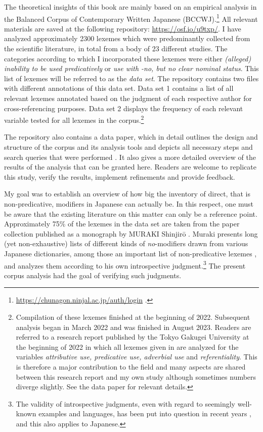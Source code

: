 \documentclass [output=book,colorlinks,citecolor=brown]{langscibook}
\begin{document}
The theoretical insights of this book are mainly based on an empirical analysis in the Balanced Corpus of Contemporary Written Japanese (BCCWJ).\footnote{\url{https://chunagon.ninjal.ac.jp/auth/login} \citep{maekawa:2014:bccwj}.} All relevant materials are saved at the following repository: \url{https://osf.io/u9txp/}. I have analyzed approximately 2300 lexemes which were predominantly collected from the scientific literature, in total from a body of 23 different studies. The categories according to which I incorporated these lexemes were either \textit{(alleged) inability to be used predicatively} or \textit{use with -no, but no clear nominal status}. This list of lexemes will be referred to as the \textit{data set}. The repository contains two files with different annotations of this data set. Data set 1 contains a list of all relevant lexemes annotated based on the judgment of each respective author for cross-referencing purposes. Data set 2 displays the frequency of each relevant variable tested for all lexemes in the corpus.\footnote{Compilation of these lexemes finished at the beginning of 2022. Subsequent analysis began in March 2022 and was finished in August 2023. Readers are referred to a research report published by the Tokyo Gakugei University at the beginning of 2022 \citep{abe:2022:no} in which all lexemes given in \citet{muraki:2012:nihongo} are analyzed for the variables \textit{attributive use, predicative use, adverbial use} and \textit{referentiality}. This is therefore a major contribution to the field and many aspects are shared between this research report and my own study although sometimes numbers diverge slightly. See the data paper for relevant details.} %

The repository also contains a data paper, which in detail outlines the design and structure of the corpus and its analysis tools and depicts all necessary steps and search queries that were performed \citep{kohlich:2023:suppl}. It also gives a more detailed overview of the results of the analysis that can be granted here. Readers are welcome to replicate this study, verify the results, implement refinements and provide feedback.

My goal was to establish an overview of how big the inventory of direct, that is non-predicative, modifiers in Japanese can actually be. In this respect, one must be aware that the existing literature on this matter can only be a reference point. Approximately 75\% of the lexemes in the data set are taken from the paper collection published as a monograph by MURAKI Shinjirō \citep{muraki:2012:nihongo}. Muraki presents long (yet non-exhaustive) lists of different kinds of \textit{no}-modifiers drawn from various Japanese dictionaries, among those an important list of non-predicative lexemes \citep[96–98]{muraki:2012:nihongo}, and analyzes them according to his own introspective judgment.\footnote{The validity of introspective judgments, even with regard to seemingly well-known examples and languages, has been put into question in recent years \citep{gibson:2010:weak}, and this also applies to Japanese.} The present corpus analysis had the goal of verifying such judgments.
\end{document}
